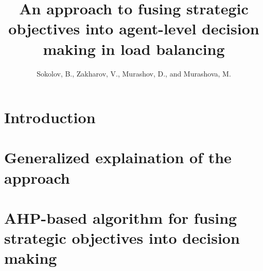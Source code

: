 \documentclass{article}
\author{Sokolov, B., Zakharov, V., Murashov, D., and Murashova, M.}
\title{An approach to fusing strategic objectives into agent-level decision making in load balancing}
\begin{document}
    \maketitle

    

    \section{Introduction}

    

    

    

    \section{Generalized explaination of the approach}
    \label{sect:approachGen}

    

    \section{AHP-based algorithm for fusing strategic objectives into decision making}
    \label{sect:approachFormal}

    

    
    \label{sect:relayRace}

    
    \label{sect:conclusion}

    

    \medskip

    

    
\end{document}
